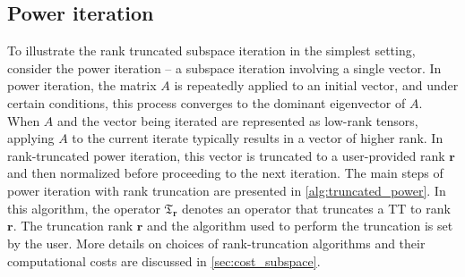\documentclass[10pt,preprint]{elsarticle}
\begin{document}
\subsection{Power iteration}
\label{sec:power_iter}

To illustrate the rank truncated subspace iteration in the simplest setting, consider the power iteration -- a subspace iteration involving a single vector. In power iteration, the matrix $A$ is repeatedly applied to an initial vector, and under certain conditions, this process converges to the dominant eigenvector of $A$. When $A$ and the vector being iterated are represented as low-rank tensors, applying $A$ to the current iterate typically results in a vector of higher rank. In rank-truncated power iteration, this vector is truncated to a user-provided rank $\bm r$ and then normalized before proceeding to the next iteration. The main steps of power iteration with rank truncation are presented in \cref{alg:truncated_power}. In this algorithm, the operator $\mathfrak{T}_{\bm r}$ denotes an operator that truncates a TT to rank $\bm r$. The truncation rank $\bm r$ and the algorithm used to perform the truncation is set by the user. More details on choices of rank-truncation algorithms and their computational costs are discussed in \cref{sec:cost_subspace}.

\end{document}
